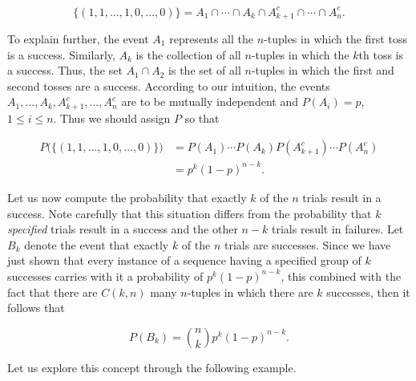 \documentclass{article}
\theoremstyle{definition}
\theoremstyle{remark}
\theoremstyle{definition}
\begin{document}
    \begin{equation*}
        \{(1,1,\dots,1,0,\dots,0)\}=A_1\cap\cdots\cap A_k\cap A_{k+1}^c\cap\cdots\cap A_{n}^c.
    \end{equation*}
    
    \noindent To explain further, the event $A_1$ represents all the $n$-tuples in which the first toss is a success. Similarly, $A_k$ is the collection of all $n$-tuples in which the $k$th toss is a success. Thus, the set $A_1\cap A_2$ is the set of all $n$-tuples in which the first and second tosses are a success. According to our intuition, the events $A_1, \dots, A_k, A_{k+1}^c, \dots, A_n^c$ are to be mutually independent and $P(A_i)=p$, $1\leq i\leq n$. Thus we should assign $P$ so that 
    
    \begin{equation*}
        \begin{split}
            P\big(\{(1,1,\dots,1,0,\dots,0)\}\big) &= P(A_1)\cdots P(A_k)P(A_{k+1}^c)\cdots P(A_n^c) \\
            &= p^k(1-p)^{n-k}.
        \end{split}
    \end{equation*}
    
    Let us now compute the probability that exactly $k$ of the $n$ trials result in a success. Note carefully that this situation differs from the probability that $k$ \textit{specified} trials result in a success and the other $n-k$ trials result in failures. Let $B_k$ denote the event that exactly $k$ of the $n$ trials are successes. Since we have just shown that every instance of a sequence having a specified group of $k$ successes carries with it a probability of $p^k(1-p)^{n-k}$, this combined with the fact that there are $C(k,n)$ many $n$-tuples in which there are $k$ successes, then it follows that 
    
    \begin{equation*}
        P(B_k)=\binom{n}{k}p^k(1-p)^{n-k}.
    \end{equation*}
    
    Let us explore this concept through the following example.
    
    \newpage
    
\end{document}

